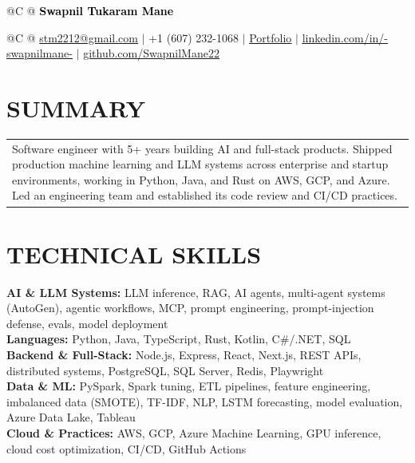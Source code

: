 \documentclass[a4paper,10pt]{extarticle}
\begin{document}
\pagestyle{empty}

\begin{tabularx}{\linewidth}{@{}C @{}}
{\fontsize{16}{16} \textcolor{black}{\textbf{{Swapnil Tukaram Mane}}}}
\end{tabularx}

\vspace{-2pt}

\begin{tabularx}{\linewidth}{@{}C @{}}
{\href{mailto:stm2212@gmail.com}{stm2212@gmail.com}} $|$ +1 (607) 232-1068 $|$
\uline{\href{https://swapnilmane22.github.io/portfolio/}{Portfolio}} $|$
\uline{\href{https://www.linkedin.com/in/-swapnilmane-/}{linkedin.com/in/-swapnilmane-}} $|$
\uline{\href{https://github.com/SwapnilMane22}{github.com/SwapnilMane22}}
\end{tabularx}

\raggedright

\section*{SUMMARY}
\begin{tabularx}{\linewidth}{@{}>{\raggedright\arraybackslash}X@{}}
Software engineer with 5+ years building AI and full-stack products. Shipped production machine learning and LLM systems across enterprise and startup environments, working in Python, Java, and Rust on AWS, GCP, and Azure. Led an engineering team and established its code review and CI/CD practices.
\end{tabularx}

\section{{TECHNICAL SKILLS}}
\vspace{2pt}
\textbf{AI \& LLM Systems:}\hspace*{0ex} LLM inference, RAG, AI agents, multi-agent systems (AutoGen), agentic workflows, MCP, prompt engineering, prompt-injection defense, evals, model deployment \\[2pt]
\textbf{Languages:}\hspace*{0ex} Python, Java, TypeScript, Rust, Kotlin, C\#/.NET, SQL \\[2pt]
\textbf{Backend \& Full-Stack:}\hspace*{0ex} Node.js, Express, React, Next.js, REST APIs, distributed systems, PostgreSQL, SQL Server, Redis, Playwright \\[2pt]
\textbf{Data \& ML:}\hspace*{0ex} PySpark, Spark tuning, ETL pipelines, feature engineering, imbalanced data (SMOTE), TF-IDF, NLP, LSTM forecasting, model evaluation, Azure Data Lake, Tableau \\[2pt]
\textbf{Cloud \& Practices:}\hspace*{0ex} AWS, GCP, Azure Machine Learning, GPU inference, cloud cost optimization, CI/CD, GitHub Actions
\end{document}
